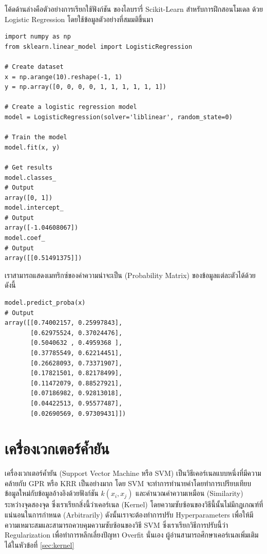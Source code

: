 โค้ดด้านล่างคือตัวอย่างการเรียกใช้ฟังก์ชัน  ของไลบรารี่ Scikit-Learn สำหรับการฝึกสอนโมเดล%
ด้วย Logistic Regression โดยใช้ข้อมูลตัวอย่างที่สมมติขึ้นมา

\begin{lstlisting}[style=MyPython]
import numpy as np
from sklearn.linear_model import LogisticRegression

# Create dataset
x = np.arange(10).reshape(-1, 1)
y = np.array([0, 0, 0, 0, 1, 1, 1, 1, 1, 1])

# Create a logistic regression model
model = LogisticRegression(solver='liblinear', random_state=0)

# Train the model
model.fit(x, y)

# Get results
model.classes_
# Output
array([0, 1])
model.intercept_
# Output
array([-1.04608067])
model.coef_
# Output
array([[0.51491375]])
\end{lstlisting}

\noindent เราสามารถแสดงเมทริกซ์ของค่าความน่าจะเป็น (Probability Matrix) ของข้อมูลแต่ละตัวได้ด้วย ดังนี้

\begin{lstlisting}[style=MyPython]
model.predict_proba(x)
# Output
array([[0.74002157, 0.25997843],
       [0.62975524, 0.37024476],
       [0.5040632 , 0.4959368 ],
       [0.37785549, 0.62214451],
       [0.26628093, 0.73371907],
       [0.17821501, 0.82178499],
       [0.11472079, 0.88527921],
       [0.07186982, 0.92813018],
       [0.04422513, 0.95577487],
       [0.02690569, 0.97309431]])
\end{lstlisting}

\section{เครื่องเวกเตอร์ค้ำยัน}
\label{sec:svm}

เครื่องเวกเตอร์ค้ำยัน (Support Vector Machine หรือ SVM) เป็นวิธีเคอร์เนลแบบหนึ่งที่มีความคล้ายกับ GPR หรือ KRR เป็นอย่างมาก โดย SVM 
จะทำการทำนายค่าโดยทำการเปรียบเทียบข้อมูลใหม่กับข้อมูลอ้างอิงด้วยฟังก์ชัน $k(x_{i},x_{j})$ และคำนวณค่าความเหมือน (Similarity) 
ระหว่างจุดสองจุด ซึ่งเราเรียกสิ่งนี้ว่าเคอร์เนล (Kernel) โดยความซับซ้อนของวิธีนี้นั้นไม่มีกฎเกณฑ์ที่แน่นอนในการกำหนด (Arbitrarily)
ดังนั้นเราจะต้องทำการปรับ Hyperparameters เพื่อให้มีความเหมาะสมและสามารถควบคุมความซับซ้อนของวิธี SVM ซึ่งเราเรียกวิธีการปรับนี้ว่า 
Regularization เพื่อทำการหลีกเลี่ยงปัญหา Overfit นั่นเอง ผู้อ่านสามารถศึกษาเคอร์เนลเพิ่มเติมได้ในหัวข้อที่ \ref{sec:kernel}

